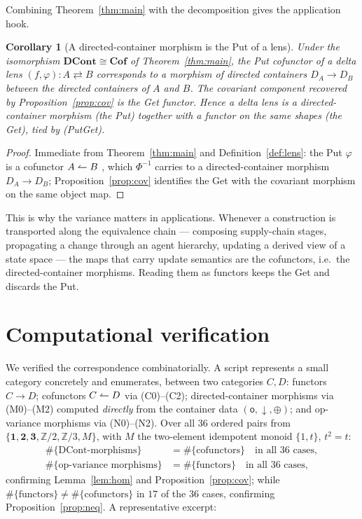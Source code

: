 \documentclass[11pt,a4paper]{amsart}
\newcommand{\Cof}{\mathbf{Cof}}
\newcommand{\DCont}{\mathbf{DCont}}
\newcommand{\co}{\mathrel{\text{\reflectbox{$\rightharpoonup$}}}}
\theoremstyle{plain}
\newtheorem{corollary}[theorem]{Corollary}
\theoremstyle{definition}
\theoremstyle{remark}
\begin{document}
Combining Theorem~\ref{thm:main} with the decomposition gives the application hook.

\begin{corollary}[A directed-container morphism is the Put of a lens]\label{cor:lens}
Under the isomorphism $\DCont\cong\Cof$ of Theorem~\ref{thm:main}, the Put cofunctor of a
delta lens $(f,\varphi)\colon A\rightleftarrows B$ corresponds to a morphism of directed
containers $D_A\to D_B$ between the directed containers of $A$ and $B$. The covariant
component recovered by Proposition~\ref{prop:cov} is the Get functor. Hence a delta
lens is a directed-container morphism (the Put) together with a functor on the same
shapes (the Get), tied by (PutGet).
\end{corollary}

\begin{proof}
Immediate from Theorem~\ref{thm:main} and Definition~\ref{def:lens}: the Put $\varphi$ is
a cofunctor $A\co B$ \cite{Clarke22}, which $\Phi^{-1}$ carries to a directed-container
morphism $D_A\to D_B$; Proposition~\ref{prop:cov} identifies the Get with the covariant
morphism on the same object map.
\end{proof}

This is why the variance matters in applications. Whenever a construction is transported
along the equivalence chain --- composing supply-chain stages, propagating a change
through an agent hierarchy, updating a derived view of a state space --- the maps that
carry update semantics are the cofunctors, i.e.\ the directed-container morphisms.
Reading them as functors keeps the Get and discards the Put.

\section{Computational verification}\label{sec:verify}

We verified the correspondence combinatorially. A script represents a small category
concretely and enumerates, between two categories $C,D$: functors $C\to D$; cofunctors
$C\co D$ via (C0)--(C2); directed-container morphisms via (M0)--(M2) computed
\emph{directly} from the container data $(\mathsf o,\downarrow,\oplus)$; and op-variance
morphisms via (N0)--(N2). Over all $36$ ordered pairs from
$\{\mathbf 1,\mathbf 2,\mathbf 3,\mathbb Z/2,\mathbb Z/3,M\}$, with $M$ the two-element
idempotent monoid $\{1,t\}$, $t^2=t$:
\[
  \begin{aligned}
  \#\{\text{DCont-morphisms}\}&=\#\{\text{cofunctors}\}\quad\text{in all }36\text{ cases},\\
  \#\{\text{op-variance morphisms}\}&=\#\{\text{functors}\}\quad\text{in all }36\text{ cases},
  \end{aligned}
\]
confirming Lemma~\ref{lem:hom} and Proposition~\ref{prop:cov}; while
$\#\{\text{functors}\}\neq\#\{\text{cofunctors}\}$ in $17$ of the $36$ cases, confirming
Proposition~\ref{prop:neq}. A representative excerpt:
\end{document}
